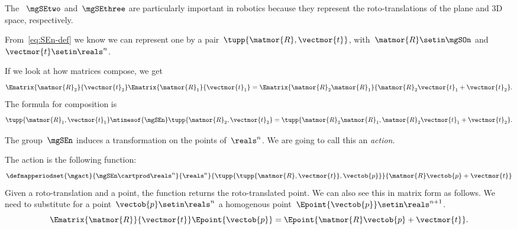 {The ~$\mgSEtwo$ and~$\mgSEthree$ are particularly important in robotics because they represent the roto-translations of the plane and 3D space, respectively.

From~\cref{eq:SEn-def} we know we can represent one by a pair~$\tupp{\matmor{R}, \vectmor{t}}$, with~$\matmor{R}\setin\mgSOn$ and~$\vectmor{t} \setin \reals^n$.

If we look at how matrices compose, we get
%
\begin{equation}
    \label{eq:SE-composition}
    \Ematrix{\matmor{R}_2}{\vectmor{t}_2} \Ematrix{\matmor{R}_1}{\vectmor{t}_1} = \Ematrix{\matmor{R}_2 \matmor{R}_1}{\matmor{R}_2\vectmor{t}_1 + \vectmor{t}_2}.
\end{equation}
%
The formula for composition is
%
\begin{equation}
    \label{eq:SE-composition-short}
    \tupp{\matmor{R}_1, \vectmor{t}_1} \mtimesof{\mgSEn} \tupp{\matmor{R}_2, \vectmor{t}_2} = \tupp{\matmor{R}_2 \matmor{R}_1, \matmor{R}_2 \vectmor{t}_1 + \vectmor{t}_2}.
\end{equation}
%

%

The group~$\mgSEn$ induces a transformation on the points of~$\reals^n$.
We are going to call this an \emph{action}.

The action is the following function:
%
\begin{equation}
    \label{eq:apply}
    \defmapperiodset{\mgact}{
        \mgSEn \cartprod \reals^n
    }{
        \reals^n
    }{
        \tupp{ \tupp{\matmor{R}, \vectmor{t}}, \vectob{p}}
    }{
        \matmor{R}\vectob{p} + \vectmor{t}
    }
\end{equation}
Given a roto-translation and a point, the function returns the roto-translated point.
%
We can also see this in matrix form as follows.
We need to substitute for a point~$\vectob{p} \setin \reals^n$ a homogenous point~$\Epoint{\vectob{p}} \setin \reals^{n+1}$.
%
\begin{equation}
    \label{eq:homogenous}
    \Ematrix{\matmor{R}}{\vectmor{t}}
    \Epoint{\vectob{p}}
    =
    \Epoint{\matmor{R}\vectob{p} + \vectmor{t}}.
\end{equation}
%

}
